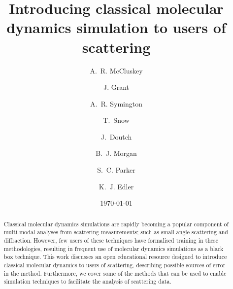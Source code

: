 \documentclass[amsmath,amssymb,twocolumn,superscriptaddress]{revtex4-1}
\begin{document}

\title{Introducing classical molecular dynamics simulation to users of
scattering}

\author{A.~R. McCluskey}

\author{J. Grant}

\author{A.~R. Symington}

\author{T.~Snow}

\author{J.~Doutch}

\author{B.~J. Morgan}

\author{S.~C. Parker}

\author{K.~J. Edler}

\date{\today}

\begin{abstract}
\noindent Classical molecular dynamics simulations are rapidly becoming a popular component of multi-modal analyses from scattering measurements; such as small angle scattering and diffraction.
However, few users of these techniques have formalised training in these methodologies, resulting in frequent use of molecular dynamics simulations as a black box technique.
This work discusses an open educational resource designed to introduce classical molecular dynamics to users of scattering, describing possible sources of error in the method.
Furthermore, we cover some of the methods that can be used to enable simulation techniques to facilitate the analysis of scattering data.
\end{abstract}

\maketitle                        %
\end{document}
